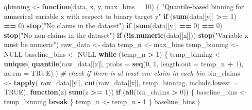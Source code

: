 \documentclass[
  english,
  11pt,
]{article}
\newenvironment{Shaded}{\begin{snugshade}}{\end{snugshade}}
\newcommand{\AttributeTok}[1]{\textcolor[rgb]{0.13,0.29,0.53}{#1}}
\newcommand{\CommentTok}[1]{\textcolor[rgb]{0.56,0.35,0.01}{\textit{#1}}}
\newcommand{\ConstantTok}[1]{\textcolor[rgb]{0.56,0.35,0.01}{#1}}
\newcommand{\ControlFlowTok}[1]{\textcolor[rgb]{0.13,0.29,0.53}{\textbf{#1}}}
\newcommand{\DecValTok}[1]{\textcolor[rgb]{0.00,0.00,0.81}{#1}}
\newcommand{\FunctionTok}[1]{\textcolor[rgb]{0.13,0.29,0.53}{\textbf{#1}}}
\newcommand{\NormalTok}[1]{#1}
\newcommand{\OtherTok}[1]{\textcolor[rgb]{0.56,0.35,0.01}{#1}}
\newcommand{\SpecialCharTok}[1]{\textcolor[rgb]{0.81,0.36,0.00}{\textbf{#1}}}
\newcommand{\StringTok}[1]{\textcolor[rgb]{0.31,0.60,0.02}{#1}}
\begin{document}
\begin{Shaded}
\begin{Highlighting}[]
\NormalTok{qbinning }\OtherTok{\textless{}{-}} \ControlFlowTok{function}\NormalTok{(data, x, y, }\AttributeTok{max\_bins =} \DecValTok{10}\NormalTok{) \{}
    \StringTok{"Quantile{-}based binning for numerical variable x with respect to binary target y"}
    \ControlFlowTok{if}\NormalTok{ (}\FunctionTok{sum}\NormalTok{(data[[y]] }\SpecialCharTok{\textgreater{}=} \DecValTok{1}\NormalTok{) }\SpecialCharTok{==} \DecValTok{0}\NormalTok{) }\FunctionTok{stop}\NormalTok{(}\StringTok{"No claims in the dataset"}\NormalTok{)}
    \ControlFlowTok{if}\NormalTok{ (}\FunctionTok{sum}\NormalTok{(data[[y]] }\SpecialCharTok{==} \DecValTok{0}\NormalTok{) }\SpecialCharTok{==} \DecValTok{0}\NormalTok{) }\FunctionTok{stop}\NormalTok{(}\StringTok{"No non{-}claims in the dataset"}\NormalTok{)}
    \ControlFlowTok{if}\NormalTok{ (}\SpecialCharTok{!}\FunctionTok{is.numeric}\NormalTok{(data[[x]])) }\FunctionTok{stop}\NormalTok{(}\StringTok{"Variable x must be numeric"}\NormalTok{)}
\NormalTok{    raw\_data }\OtherTok{\textless{}{-}}\NormalTok{ data}
\NormalTok{    temp\_n }\OtherTok{\textless{}{-}}\NormalTok{ max\_bins}
\NormalTok{    temp\_binning }\OtherTok{\textless{}{-}} \ConstantTok{NULL}
\NormalTok{    baseline\_bins }\OtherTok{\textless{}{-}} \ConstantTok{NULL}
    \ControlFlowTok{while}\NormalTok{ (temp\_n }\SpecialCharTok{\textgreater{}} \DecValTok{1}\NormalTok{) \{}
\NormalTok{        temp\_binning }\OtherTok{\textless{}{-}} \FunctionTok{unique}\NormalTok{(}
            \FunctionTok{quantile}\NormalTok{(raw\_data[[x]], }\AttributeTok{probs =} \FunctionTok{seq}\NormalTok{(}\DecValTok{0}\NormalTok{, }\DecValTok{1}\NormalTok{, }\AttributeTok{length.out =}\NormalTok{ temp\_n }\SpecialCharTok{+} \DecValTok{1}\NormalTok{), }\AttributeTok{na.rm =} \ConstantTok{TRUE}\NormalTok{)}
\NormalTok{        )}
        \CommentTok{\# check if there is at least one claim in each bin}
\NormalTok{        bin\_claims }\OtherTok{\textless{}{-}} \FunctionTok{tapply}\NormalTok{(}
\NormalTok{            raw\_data[[y]],}
            \FunctionTok{cut}\NormalTok{(raw\_data[[x]], temp\_binning, }\AttributeTok{include.lowest =} \ConstantTok{TRUE}\NormalTok{),}
            \ControlFlowTok{function}\NormalTok{(z) }\FunctionTok{sum}\NormalTok{(z }\SpecialCharTok{\textgreater{}=} \DecValTok{1}\NormalTok{))}
        \ControlFlowTok{if}\NormalTok{ (}\FunctionTok{all}\NormalTok{(bin\_claims }\SpecialCharTok{\textgreater{}} \DecValTok{0}\NormalTok{)) \{}
\NormalTok{            baseline\_bins }\OtherTok{\textless{}{-}}\NormalTok{ temp\_binning}
            \ControlFlowTok{break}
\NormalTok{        \}}
\NormalTok{        temp\_n }\OtherTok{\textless{}{-}}\NormalTok{ temp\_n }\SpecialCharTok{{-}} \DecValTok{1}
\NormalTok{    \}}
\NormalTok{    baseline\_bins}
\NormalTok{\}}
\end{Highlighting}
\end{Shaded}
\end{document}
